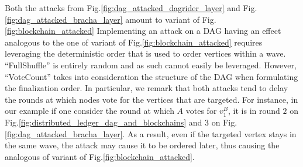 Both the attacks from Fig.\ref{fig:dag_attacked_dagrider_layer} and Fig.\ref{fig:dag_attacked_bracha_layer} amount to variant  of Fig.\ref{fig:blockchain_attacked}
Implementing an attack on a DAG having an effect analogous to the one of variant  of Fig.\ref{fig:blockchain_attacked} requires leveraging the deterministic order that is used to order vertices within a wave.
``FullShuffle'' is entirely random and as such cannot easily be leveraged.
However, ``VoteCount'' takes into consideration the structure of the DAG when formulating the finalization order. 
In particular, we remark that both attacks tend to delay the rounds at which nodes vote for the vertices that are targeted.
For instance, in our example if one consider the round at which $A$ votes for $v_1^B$, it is in round $2$ on Fig.\ref{fig:distributed_ledger_dag_and_blockchains} and $3$ on Fig.\ref{fig:dag_attacked_bracha_layer}.
As a result, even if the targeted vertex stays in the same wave, the attack may cause it to be ordered later, thus causing the analogous of variant  of Fig.\ref{fig:blockchain_attacked}.


